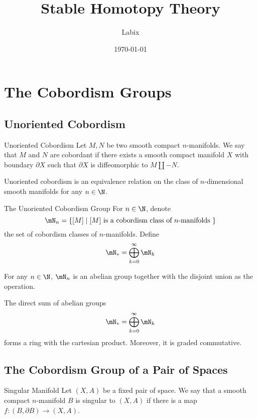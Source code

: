 \documentclass[a4paper]{article}
\title{Stable Homotopy Theory}
\author{Labix}
\date{\today}
\begin{document}
\maketitle
\begin{abstract}
\begin{itemize}
\end{itemize}
\end{abstract}
\pagebreak
\tableofcontents

\pagebreak
\section{The Cobordism Groups}
\subsection{Unoriented Cobordism}
\begin{defn}{Unoriented Cobordism}{} Let $M,N$ be two smooth compact $n$-manifolds. We say that $M$ and $N$ are cobordant if there exists a smooth compact manifold $X$ with boundary $\partial X$ such that $\partial X$ is diffeomorphic to $M\coprod -N$. 
\end{defn}

\begin{lmm}{}{} Unoriented cobordism is an equivalence relation on the class of $n$-dimensional smooth manifolds for any $n\in\N$. 
\end{lmm}

\begin{defn}{The Unoriented Cobordism Group}{} For $n\in\N$, denote $$\mN_n=\{[M]\;|\;[M]\text{ is a cobordism class of }n\text{-manifolds }\}$$ the set of cobordism classes of $n$-manifolds. Define $$\mN_\ast=\bigoplus_{k=0}^\infty\mN_k$$
\end{defn}

\begin{lmm}{}{} For any $n\in\N$, $\mN_n$ is an abelian group together with the disjoint union as the operation. 
\end{lmm}

\begin{prp}{}{} The direct sum of abelian groups $$\mN_\ast=\bigoplus_{k=0}^\infty\mN_k$$ forms a ring with the cartesian product. Moreover, it is graded commutative. 
\end{prp}

\subsection{The Cobordism Group of a Pair of Spaces}
\begin{defn}{Singular Manifold}{} Let $(X,A)$ be a fixed pair of space. We say that a smooth compact $n$-manifold $B$ is singular to $(X,A)$ if there is a map $f:(B,\partial B)\to(X,A)$. 
\end{defn}
\end{document}
